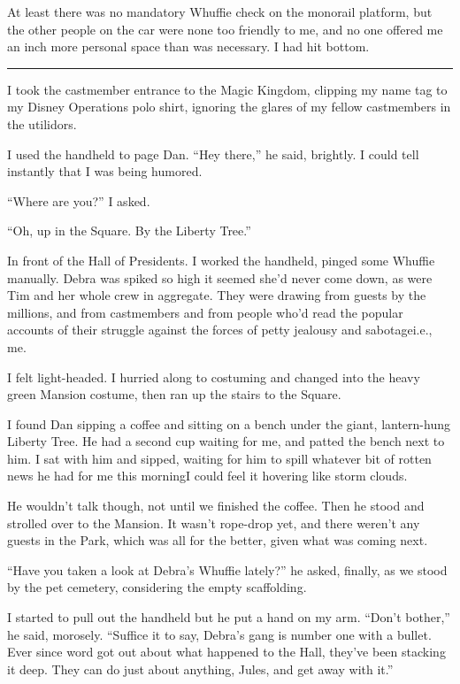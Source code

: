 At least there was no mandatory Whuffie check on the monorail
platform, but the other people on the car were none too friendly to
me, and no one offered me an inch more personal space than was
necessary. I had hit bottom.

\begin{center}\rule{1in}{0.4pt}\end{center}

I took the castmember entrance to the Magic Kingdom, clipping my
name tag to my Disney Operations polo shirt, ignoring the glares of
my fellow castmembers in the utilidors.

I used the handheld to page Dan. “Hey there,” he said, brightly. I
could tell instantly that I was being humored.

“Where are you?” I asked.

“Oh, up in the Square. By the Liberty Tree.”

In front of the Hall of Presidents. I worked the handheld, pinged
some Whuffie manually. Debra was spiked so high it seemed she'd
never come down, as were Tim and her whole crew in aggregate. They
were drawing from guests by the millions, and from castmembers and
from people who'd read the popular accounts of their struggle
against the forces of petty jealousy and sabotage{\dash}i.e., me.

I felt light-headed. I hurried along to costuming and changed into
the heavy green Mansion costume, then ran up the stairs to the
Square.

I found Dan sipping a coffee and sitting on a bench under the
giant, lantern-hung Liberty Tree. He had a second cup waiting for
me, and patted the bench next to him. I sat with him and sipped,
waiting for him to spill whatever bit of rotten news he had for me
this morning{\dash}I could feel it hovering like storm clouds.

He wouldn't talk though, not until we finished the coffee. Then he
stood and strolled over to the Mansion. It wasn't rope-drop yet,
and there weren't any guests in the Park, which was all for the
better, given what was coming next.

“Have you taken a look at Debra's Whuffie lately?” he asked,
finally, as we stood by the pet cemetery, considering the empty
scaffolding.

I started to pull out the handheld but he put a hand on my arm.
“Don't bother,” he said, morosely. “Suffice it to say, Debra's gang
is number one with a bullet. Ever since word got out about what
happened to the Hall, they've been stacking it deep. They can do
just about anything, Jules, and get away with it.”


